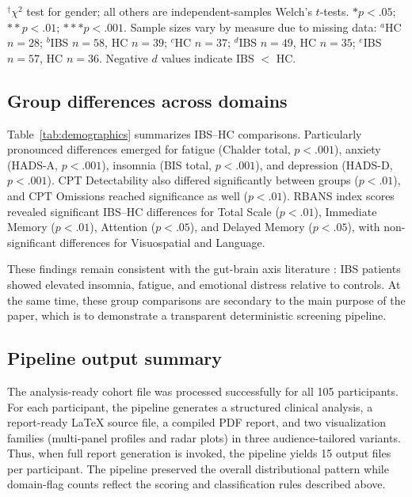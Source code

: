 \documentclass[11pt,a4paper]{article}
\begin{document}
\begin{table}[H]
\smallskip
\footnotesize
$^{\dagger}\chi^2$ test for gender; all others are independent-samples Welch's $t$-tests. $*p < .05$; $**p < .01$; $***p < .001$. Sample sizes vary by measure due to missing data: $^{a}$HC $n = 28$; $^{b}$IBS $n = 58$, HC $n = 39$; $^{c}$HC $n = 37$; $^{d}$IBS $n = 49$, HC $n = 35$; $^{e}$IBS $n = 57$, HC $n = 36$. Negative $d$ values indicate IBS $<$ HC.
\end{table}


\subsection{Group differences across domains}

Table~\ref{tab:demographics} summarizes IBS--HC comparisons. Particularly pronounced differences emerged for fatigue (Chalder total, $p < .001$), anxiety (HADS-A, $p < .001$), insomnia (BIS total, $p < .001$), and depression (HADS-D, $p < .001$). CPT Detectability also differed significantly between groups ($p < .01$), and CPT Omissions reached significance as well ($p < .01$). RBANS index scores revealed significant IBS--HC differences for Total Scale ($p < .01$), Immediate Memory ($p < .01$), Attention ($p < .05$), and Delayed Memory ($p < .05$), with non-significant differences for Visuospatial and Language.

These findings remain consistent with the gut-brain axis literature \citep{Cryan2019, Mayer2015}: IBS patients showed elevated insomnia, fatigue, and emotional distress relative to controls.
At the same time, these group comparisons are secondary to the main purpose of the paper, which is to demonstrate a transparent deterministic screening pipeline.


\subsection{Pipeline output summary}

The analysis-ready cohort file was processed successfully for all 105 participants. For each participant, the pipeline generates a structured clinical analysis, a report-ready \LaTeX{} source file, a compiled PDF report, and two visualization families (multi-panel profiles and radar plots) in three audience-tailored variants. Thus, when full report generation is invoked, the pipeline yields 15 output files per participant. The pipeline preserved the overall distributional pattern while domain-flag counts reflect the scoring and classification rules described above.
\end{document}
